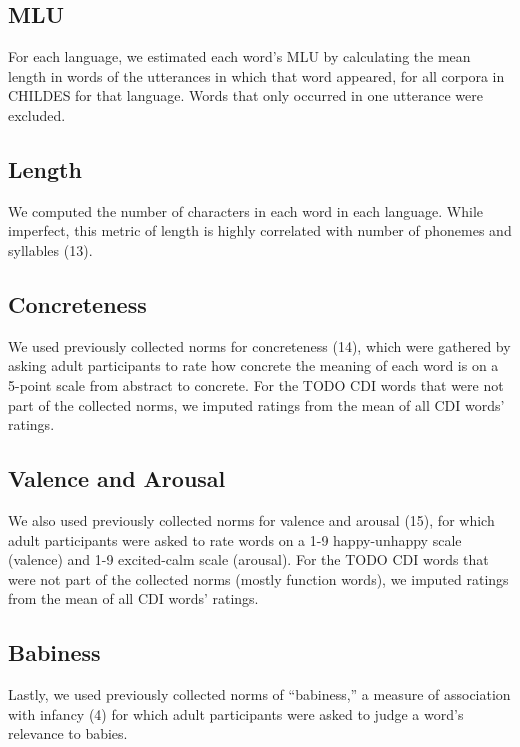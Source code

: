 \documentclass[9pt,twocolumn,twoside]{pnas-new}
\begin{document}
\subsection{MLU}\label{mlu}

For each language, we estimated each word's MLU by calculating the mean
length in words of the utterances in which that word appeared, for all
corpora in CHILDES for that language. Words that only occurred in one
utterance were excluded.

\subsection{Length}\label{length}

We computed the number of characters in each word in each language.
While imperfect, this metric of length is highly correlated with number
of phonemes and syllables (13).

\subsection{Concreteness}\label{concreteness}

We used previously collected norms for concreteness (14), which were
gathered by asking adult participants to rate how concrete the meaning
of each word is on a 5-point scale from abstract to concrete. For the
TODO CDI words that were not part of the collected norms, we imputed
ratings from the mean of all CDI words' ratings.

\subsection{Valence and Arousal}\label{valence-and-arousal}

We also used previously collected norms for valence and arousal (15),
for which adult participants were asked to rate words on a 1-9
happy-unhappy scale (valence) and 1-9 excited-calm scale (arousal). For
the TODO CDI words that were not part of the collected norms (mostly
function words), we imputed ratings from the mean of all CDI words'
ratings.

\subsection{Babiness}\label{babiness}

Lastly, we used previously collected norms of ``babiness,'' a measure of
association with infancy (4) for which adult participants were asked to
judge a word's relevance to babies.
\end{document}
